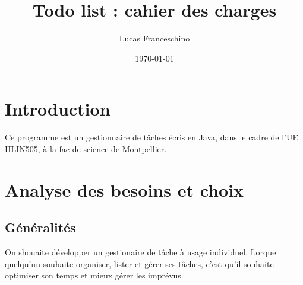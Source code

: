\documentclass{article}
\title{Todo list : cahier des charges}
\date{\today}
\author{Lucas Franceschino}
\begin{document}
	\maketitle

	\tableofcontents

	\section{Introduction}
	Ce programme est un gestionnaire de tâches écris en Java, dans le cadre de l'UE HLIN505, à la fac de science de Montpellier.\\

	\section{Analyse des besoins et choix}
		\subsection{Généralités}
			On shouaite développer un gestionaire de tâche à usage individuel. Lorque quelqu'un souhaite organiser, lister et gérer ses tâches, c'est qu'il souhaite optimiser son temps et mieux gérer les imprévus.
\end{document}
